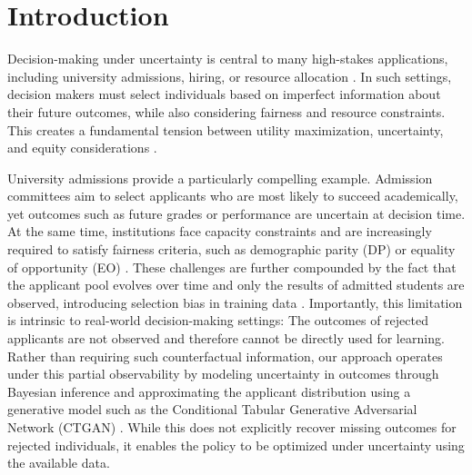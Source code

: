 \documentclass[acmlarge]{acmart-ecaf}
\begin{document}

\maketitle

\section{Introduction}
Decision-making under uncertainty is central to many high-stakes applications, including university admissions, hiring, or resource allocation \cite{gibney2007decision, schmitt2007selection, yoshimura2006decision,manski2017improving}. In such settings, decision makers must select individuals based on imperfect information about their future outcomes, while also considering fairness and resource constraints. This creates a fundamental tension between utility maximization, uncertainty, and equity considerations \cite{dwork2012fairness, hardt2016equality}.

University admissions provide a particularly compelling example. Admission committees aim to select applicants who are most likely to succeed academically, yet outcomes such as future grades or performance are uncertain at decision time. At the same time, institutions face capacity constraints and are increasingly required to satisfy fairness criteria, such as demographic parity (DP) or equality of opportunity (EO) \cite{zafar2017fairness, chaibub2020causal}. These challenges are further compounded by the fact that the applicant pool evolves over time and only the results of admitted students are observed, introducing selection bias in training data \cite{heckman1979sample, mehrotra2021mitigating}. Importantly, this limitation is intrinsic to real-world decision-making settings: The outcomes of rejected applicants are not observed and therefore cannot be directly used for learning. Rather than requiring such counterfactual information, our approach operates under this partial observability by modeling uncertainty in outcomes through Bayesian inference and approximating the applicant distribution using a generative model such as the Conditional Tabular Generative Adversarial Network (CTGAN) \cite{xu2019modeling}. While this does not explicitly recover missing outcomes for rejected individuals, it enables the policy to be optimized under uncertainty using the available data. 
\end{document}
